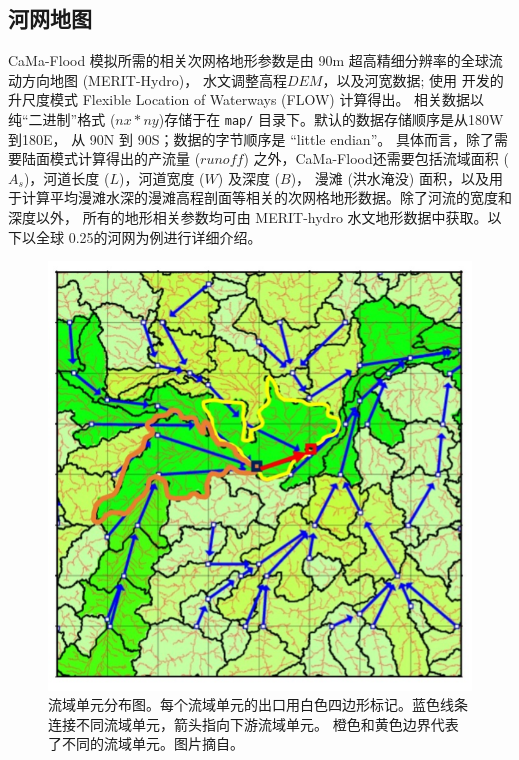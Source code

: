 \subsection{河网地图}
CaMa-Flood 模拟所需的相关次网格地形参数是由 90m 超高精细分辨率的全球流动方向地图 (MERIT-Hydro)\citep{yamazaki2019merit}，
水文调整高程$DEM$\citep{yamazaki2017high,yamazaki2012analysis}，以及河宽数据\citep{yamazaki2014development}; 
使用 \citet{yamazaki2009deriving} 开发的升尺度模式 Flexible Location of Waterways (FLOW) 计算得出。
相关数据以纯“二进制”格式 ($nx*ny$)存储于在 \texttt{map/} 目录下。默认的数据存储顺序是从180\textdegree W到180\textdegree E，
从 90\textdegree N 到 90\textdegree S；数据的字节顺序是 “little endian”。
具体而言，除了需要陆面模式计算得出的产流量 ($runoff$) 之外，CaMa-Flood还需要包括流域面积 ($A_s$)，河道长度 ($L$)，河道宽度 ($W$) 及深度 ($B$)，
漫滩 (洪水淹没) 面积，以及用于计算平均漫滩水深的漫滩高程剖面等相关的次网格地形数据。除了河流的宽度和深度以外，
所有的地形相关参数均可由 MERIT-hydro 水文地形数据中获取。以下以全球 0.25\textdegree 的河网为例进行详细介绍。
{
\begin{figure}[]
\centering
\includegraphics{Figures/陆地表面的水分循环/流域单元分布图.png}
\caption{流域单元分布图。每个流域单元的出口用白色四边形标记。蓝色线条连接不同流域单元，箭头指向下游流域单元。
橙色和黄色边界代表了不同的流域单元。图片摘自\citet{yamazaki2013improving}。 }
\label{fig:流域单元分布图}
\end{figure}
}


